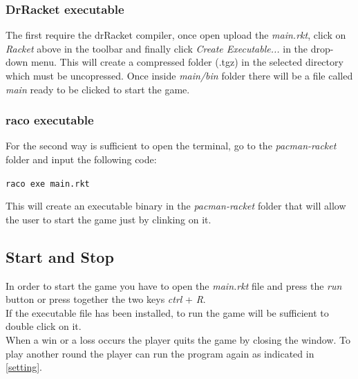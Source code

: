 \documentclass{article}
\begin{document}
\subsubsection{DrRacket executable}

The first require the drRacket compiler, once open upload the \textit{main.rkt}, click on \textit{Racket} above in the toolbar and finally click \textit{Create Executable...} in the drop-down menu. This will create a compressed folder (.tgz) in the selected directory which must be uncopressed. Once inside \textit{main/bin} folder there will be a file called \textit{main} ready to be clicked to start the game.

\subsubsection{raco executable}
For the second way is sufficient to open the terminal, go to the \textit{pacman-racket} folder and input the following code:
\begin{center}
 \texttt{raco exe main.rkt}
\end{center}

This will create an executable binary in the \textit{pacman-racket} folder that will allow the user to start the game just by clinking on it.

\subsection{Start and Stop}
In order to start the game you have to open the \textit{main.rkt} file and press the \textit{run} button or press together the two keys \textit{ctrl} + \textit{R}.\\
If the executable file has been installed, to run the game will be sufficient to double click on it. 
\\
When a win or a loss occurs the player quits the game by closing the window. To play another round the player can run the program again as indicated in \ref{setting}.

 
\end{document}
